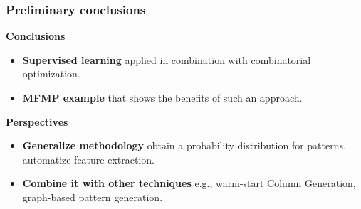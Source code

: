 \begin{frame}
\frametitle{\textbf{Preliminary conclusions}}
  \pause
  \begin{block}{\textbf{Conclusions}}
    \begin{itemize}[<+->]
    \item \textbf{Supervised learning} 
      applied in combination with combinatorial optimization.
    \item \textbf{MFMP example} 
      that shows the benefits of such an approach.
    \end{itemize}
  \end{block}  
  \pause
  \begin{block}{\textbf{Perspectives}}
    \begin{itemize}[<+->]
      \item \textbf{Generalize methodology} 
        obtain a probability distribution for patterns, automatize feature extraction.
      \item \textbf{Combine it with other techniques} 
        e.g., warm-start Column Generation, graph-based pattern generation.
    \end{itemize}
  \end{block}  
\end{frame}